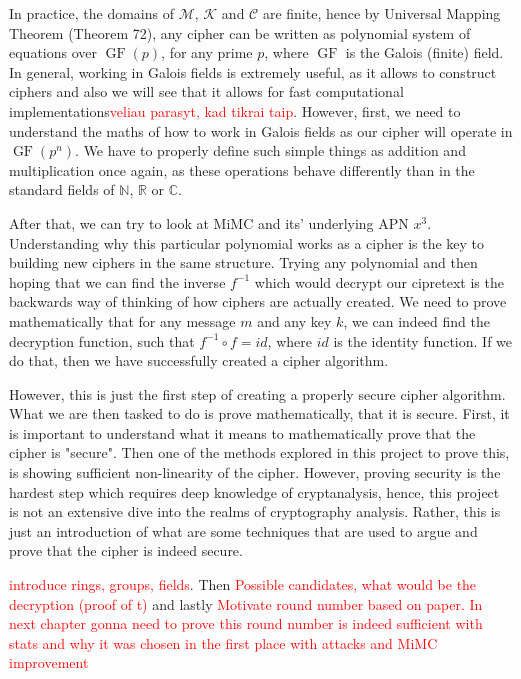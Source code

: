 \documentclass{Resources/UoBLab1}
\theoremstyle{definition}
\begin{document}
In practice, the domains of $\mathcal{M}$, $\mathcal{K}$ and $\mathcal{C}$ are finite, hence by Universal Mapping Theorem (Theorem 72\cite{CryptanalysisBook}), any cipher can be written as polynomial system of equations over $\operatorname{GF}(p)$, for any prime $p$, where $\operatorname{GF}$ is the Galois (finite) field. In general, working in Galois fields is extremely useful, as it allows to construct ciphers and also we will see that it allows for fast computational implementations\textcolor{red}{veliau parasyt, kad tikrai taip}. However, first, we need to understand the maths of how to work in Galois fields as our cipher will operate in $\operatorname{GF}(p^n)$. We have to properly define such simple things as addition and multiplication once again, as these operations behave differently than in the standard fields of $\mathbb{N}$, $\mathbb{R}$ or $\mathbb{C}$.

After that, we can try to look at MiMC and its' underlying APN $x^3$. Understanding why this particular polynomial works as a cipher is the key to building new ciphers in the same structure. Trying any polynomial and then hoping that we can find the inverse $f^{-1}$ which would decrypt our cipretext is the backwards way of thinking of how ciphers are actually created. We need to prove mathematically that for any message $m$ and any key $k$, we can indeed find the decryption function, such that \(f^{-1} \circ f = id\), where $id$ is the identity function. If we do that, then we have successfully created a cipher algorithm.

However, this is just the first step of creating a properly secure cipher algorithm. What we are then tasked to do is prove mathematically, that it is secure. First, it is important to understand what it means to mathematically prove that the cipher is "secure". Then one of the methods explored in this project to prove this, is showing sufficient non-linearity of the cipher. However, proving security is the hardest step which requires deep knowledge of cryptanalysis, hence, this project is not an extensive dive into the realms of cryptography analysis. Rather, this is just an introduction of what are some techniques that are used to argue and prove that the cipher is indeed secure.

\textcolor{red}{introduce rings, groups, fields}. Then \textcolor{red}{Possible candidates, what would be the decryption (proof of t)} and lastly \textcolor{red}{Motivate round number based on paper. In next chapter gonna need to prove this round number is indeed sufficient with stats and why it was chosen in the first place with attacks and MiMC improvement}
\end{document}
